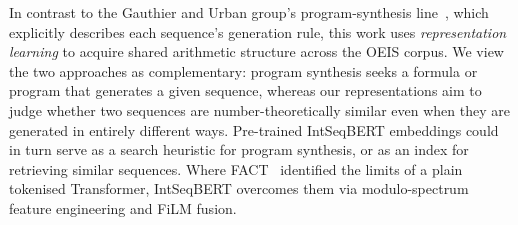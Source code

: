 In contrast to the Gauthier and Urban group's program-synthesis line~\cite{urban-alien-coding,gauthier2023qsynt,gauthier2025conjecturing},
which explicitly describes each sequence's generation rule, this work uses \emph{representation
learning} to acquire shared arithmetic structure across the OEIS corpus.
We view the two approaches as complementary: program synthesis seeks a formula or program
that generates a given sequence, whereas our representations aim to judge whether two
sequences are number-theoretically similar even when they are generated in entirely
different ways. Pre-trained IntSeqBERT embeddings could in turn serve as a search heuristic
for program synthesis, or as an index for retrieving similar sequences.
Where FACT~\cite{zurich-fact} identified the limits of a plain tokenised Transformer,
IntSeqBERT overcomes them via modulo-spectrum feature engineering and FiLM fusion.
